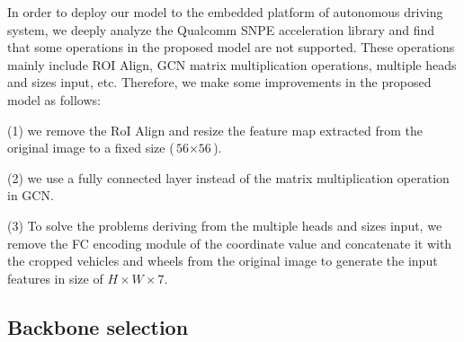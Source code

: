 \documentclass{article}
\begin{document}
In order to deploy our model to the embedded platform of autonomous driving system, we deeply analyze the Qualcomm SNPE acceleration library and find that some operations in the proposed model are not supported. These operations mainly include ROI Align, GCN matrix multiplication operations, multiple heads and sizes input, etc. Therefore, we make some improvements in the proposed model as follows:
 
(1) we remove the RoI Align and resize the feature map extracted from the original image to a fixed size ($\text{56} \times \text{56}$).
 
(2) we use a fully connected layer instead of the matrix multiplication operation in GCN.
 
(3) To solve the problems deriving from the multiple heads and sizes input, we remove the FC encoding module of the coordinate value and concatenate it with the cropped vehicles and wheels from the original image to generate the input features in size of $H \times W \times \text{7}$.





 

\subsection{Backbone selection}
\end{document}
